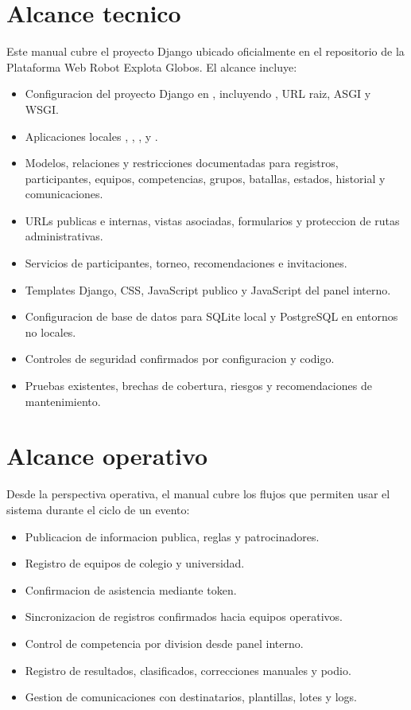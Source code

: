 \section{Alcance tecnico}
\label{sec:alcance-tecnico}

Este manual cubre el proyecto Django ubicado oficialmente en el repositorio de la Plataforma Web Robot Explota Globos. El alcance incluye:

\begin{itemize}
  \item Configuracion del proyecto Django en , incluyendo , URL raiz, ASGI y WSGI.
  \item Aplicaciones locales , , ,  y .
  \item Modelos, relaciones y restricciones documentadas para registros, participantes, equipos, competencias, grupos, batallas, estados, historial y comunicaciones.
  \item URLs publicas e internas, vistas asociadas, formularios y proteccion de rutas administrativas.
  \item Servicios de participantes, torneo, recomendaciones e invitaciones.
  \item Templates Django, CSS, JavaScript publico y JavaScript del panel interno.
  \item Configuracion de base de datos para SQLite local y PostgreSQL en entornos no locales.
  \item Controles de seguridad confirmados por configuracion y codigo.
  \item Pruebas existentes, brechas de cobertura, riesgos y recomendaciones de mantenimiento.
\end{itemize}

\section{Alcance operativo}
\label{sec:alcance-operativo}

Desde la perspectiva operativa, el manual cubre los flujos que permiten usar el sistema durante el ciclo de un evento:

\begin{itemize}
  \item Publicacion de informacion publica, reglas y patrocinadores.
  \item Registro de equipos de colegio y universidad.
  \item Confirmacion de asistencia mediante token.
  \item Sincronizacion de registros confirmados hacia equipos operativos.
  \item Control de competencia por division desde panel interno.
  \item Registro de resultados, clasificados, correcciones manuales y podio.
  \item Gestion de comunicaciones con destinatarios, plantillas, lotes y logs.
\end{itemize}

